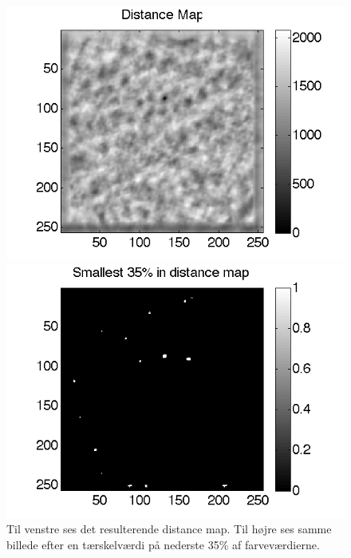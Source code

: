 \begin{figure}[H]
	\begin{minipage}[b]{0.5\linewidth}
		\centering
		\includegraphics[scale=0.5]{files/postmethod/img/conv_3.png}
	\end{minipage}
	\hspace{0.5cm}
	\begin{minipage}[b]{0.5\linewidth}
		\centering
		\includegraphics[scale=0.5]{files/postmethod/img/conv_4.png}
	\end{minipage}
	\caption{Til venstre ses det resulterende distance map. Til højre ses samme billede efter en tærskelværdi på nederste 35\% af farveværdierne.\label{fig:postmethod_conv_post}}
\end{figure}

